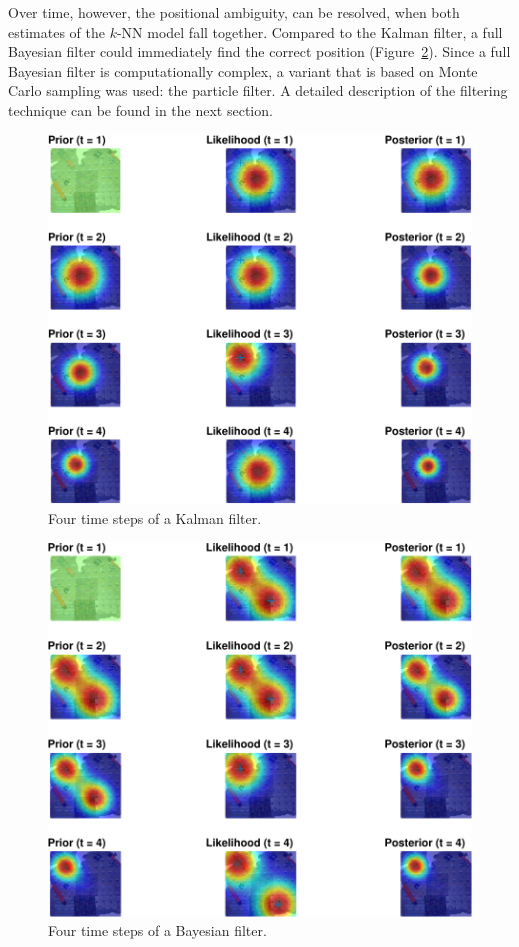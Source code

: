 \documentclass{report}
\begin{document}
Over time, however, the positional ambiguity, can be resolved, when
both estimates of the $k$-NN model fall together. Compared to the
Kalman filter, a full Bayesian filter could immediately find the
correct position (Figure~\ref{fig:bayesianfilter}). Since a full
Bayesian filter is computationally complex, a variant that is based on
Monte Carlo sampling was used: the particle filter. A detailed
description of the filtering technique can be found in the next
section.
\begin{figure}[t]
\label{fig:Kalman}
\begin{center}
\includegraphics[width=0.7\columnwidth]{kalman-crop}
\caption{ Four time steps of a Kalman filter.%
}
\end{center}
\end{figure}
\begin{figure}[t]
\label{fig:bayesianfilter}
\begin{center}
\includegraphics[width=0.7\columnwidth]{particle-crop}
\caption{ Four time steps of a Bayesian filter.}
\end{center}
\end{figure}
\end{document}
